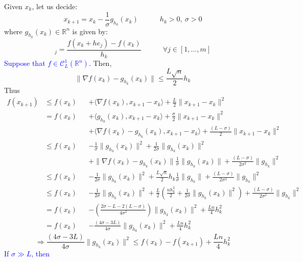 \documentclass[12pt, openany]{report}
\newcommand{\R}{\mathbb{R}}
\newcommand{\C}{\mathcal{C}}
\theoremstyle{definition}
\begin{document}
Given $x_k$, let us decide:
\begin{equation}
	x_{k+1} = x_k - \frac{1}{\sigma} g_{h_k}(x_k) \quad \quad \quad h_k > 0, \: \sigma > 0
\end{equation}
where $g_{h_k}(x_k) \in \R^n$ is given by:
\begin{equation}
	[g_{h_k}(x_k)]_j = \frac{f(x_k+he_j)-f(x_k)}{h_k} \quad \quad \quad \forall j\in [1,\dots,m]
\end{equation}
\textcolor{blue}{Suppose that $f\in \C^1_L(\R^n)$}. Then,
\begin{equation}
	\|\nabla f(x_k) - g_{h_k}(x_k)\| \leq \frac{L \sqrt{n}}{2} h_k
\end{equation}
Thus 
\begin{equation}
	\begin{aligned}
		f(x_{k+1}) &\leq f(x_k) &&+ \langle \nabla f(x_k), x_{k+1}-x_k\rangle + \frac{L}{2}\lVert x_{k+1}-x_k\rVert^2\\
		&= f(x_k) &&+ \langle g_{h_k}(x_k), x_{k+1}-x_k\rangle + \frac{\sigma}{2} \|x_{k+1}-x_k\|^2\\
		& &&+ \langle \nabla f(x_k) - g_{h_k}(x_k), x_{k+1}-x_k\rangle + \frac{(L-\sigma)}{2}\lVert x_{k+1}-x_k\rVert^2\\
		&\leq f(x_k) &&- \frac{1}{\sigma} \|g_{h_k}(x_k)\|^2 + \frac{1}{2\sigma} \|g_{h_k}(x_k)\|^2 \\
		& &&+ \| \nabla f(x_k) - g_{h_k}(x_k)\| \frac{1}{\sigma} \|g_{h_k}(x_k)\| + \frac{(L-\sigma)}{2\sigma^2} \|g_{h_k}\|^2\\
		& \leq f(x_k) &&- \frac{1}{2\sigma} \|g_{h_k}(x_k)\|^2 + \frac{L \sqrt{n}}{2} h_k \frac{1}{\sigma} \|g_{h_k}\| + \frac{(L-\sigma)}{2\sigma^2} \|g_{h_k}\|^2\\
		&\leq f(x_k) &&- \frac{1}{2\sigma} \|g_{h_k}(x_k)\|^2 + \frac{L}{2} \left( \frac{nh_k^2}{2}+ \frac{1}{2 \sigma} \|g_{h_k}(x_k)\|^2 \right) + \frac{(L-\sigma)}{2\sigma^2} \|g_{h_k}\|^2\\
		&= f(x_k) &&- \left( \frac{2\sigma - L -2(L - \sigma)}{4 \sigma^2} \right) \|g_{h_k}(x_k)\|^2 + \frac{Ln}{4} h_k^2\\
		&= f(x_k) &&- \frac{(4\sigma -3L)}{4 \sigma} \|g_{h_k}(x_k)\|^2  + \frac{Ln}{4} h_k^2
	\end{aligned}
\end{equation}
\begin{equation}
	\Longrightarrow \frac{(4\sigma -3L)}{4 \sigma} \|g_{h_k}(x_k)\|^2 \leq f(x_k) - f(x_{k+1}) + \frac{Ln}{4} h_k^2
\end{equation}
\textcolor{blue}{If $\sigma \gg L$, then}
\end{document}
